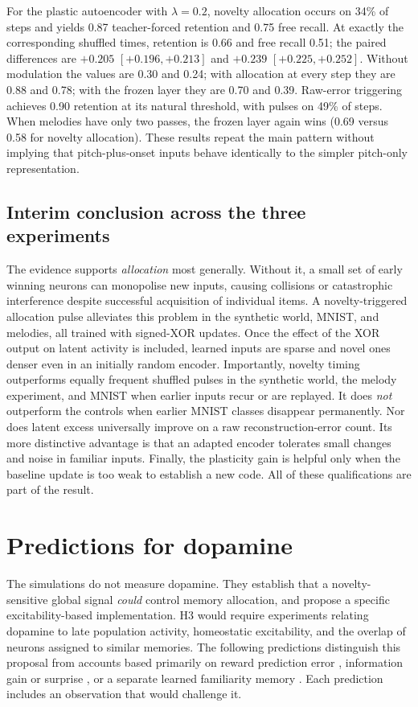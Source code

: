 \documentclass[11pt,a4paper]{article}
\begin{document}
For the plastic autoencoder with $\lambda=0.2$, novelty allocation occurs on 34\% of steps and yields 0.87 teacher-forced retention and 0.75 free recall. At exactly the corresponding shuffled times, retention is 0.66 and free recall 0.51; the paired differences are $+0.205$ $[+0.196,+0.213]$ and $+0.239$ $[+0.225,+0.252]$. Without modulation the values are 0.30 and 0.24; with allocation at every step they are 0.88 and 0.78; with the frozen layer they are 0.70 and 0.39. Raw-error triggering achieves 0.90 retention at its natural threshold, with pulses on 49\% of steps. When melodies have only two passes, the frozen layer again wins (0.69 versus 0.58 for novelty allocation). These results repeat the main pattern without implying that pitch-plus-onset inputs behave identically to the simpler pitch-only representation.

\subsection{Interim conclusion across the three experiments}
The evidence supports \emph{allocation} most generally. Without it, a small set of early winning neurons can monopolise new inputs, causing collisions or catastrophic interference despite successful acquisition of individual items. A novelty-triggered allocation pulse alleviates this problem in the synthetic world, MNIST, and melodies, all trained with signed-XOR updates. Once the effect of the XOR output on latent activity is included, learned inputs are sparse and novel ones denser even in an initially random encoder. Importantly, novelty timing outperforms equally frequent shuffled pulses in the synthetic world, the melody experiment, and MNIST when earlier inputs recur or are replayed. It does \emph{not} outperform the controls when earlier MNIST classes disappear permanently. Nor does latent excess universally improve on a raw reconstruction-error count. Its more distinctive advantage is that an adapted encoder tolerates small changes and noise in familiar inputs. Finally, the plasticity gain is helpful only when the baseline update is too weak to establish a new code. All of these qualifications are part of the result.

\section{Predictions for dopamine}\label{sec:predictions}
The simulations do not measure dopamine. They establish that a novelty-sensitive global signal \emph{could} control memory allocation, and propose a specific excitability-based implementation. H3 would require experiments relating dopamine to late population activity, homeostatic excitability, and the overlap of neurons assigned to similar memories. The following predictions distinguish this proposal from accounts based primarily on reward prediction error \citep{schultz1997}, information gain or surprise \citep{beck2026}, or a separate learned familiarity memory \citep{dasgupta2018,kakade2002}. Each prediction includes an observation that would challenge it.
\end{document}

